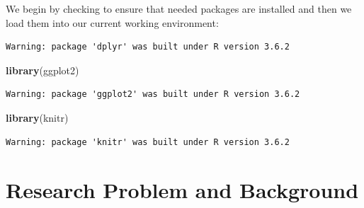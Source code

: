 \documentclass[12pt,twoside]{reedthesis}
\newenvironment{Shaded}{\begin{snugshade}}{\end{snugshade}}
\newcommand{\CommentTok}[1]{\textcolor[rgb]{0.56,0.35,0.01}{\textit{#1}}}
\newcommand{\ControlFlowTok}[1]{\textcolor[rgb]{0.13,0.29,0.53}{\textbf{#1}}}
\newcommand{\DataTypeTok}[1]{\textcolor[rgb]{0.13,0.29,0.53}{#1}}
\newcommand{\KeywordTok}[1]{\textcolor[rgb]{0.13,0.29,0.53}{\textbf{#1}}}
\newcommand{\NormalTok}[1]{#1}
\newcommand{\OperatorTok}[1]{\textcolor[rgb]{0.81,0.36,0.00}{\textbf{#1}}}
\newcommand{\StringTok}[1]{\textcolor[rgb]{0.31,0.60,0.02}{#1}}
\begin{document}
We begin by checking to ensure that needed packages are installed and then we load them into our current working environment:
\begin{Shaded}
\end{Shaded}
\begin{verbatim}
Warning: package 'dplyr' was built under R version 3.6.2
\end{verbatim}
\begin{Shaded}
\begin{Highlighting}[]
\KeywordTok{library}\NormalTok{(ggplot2)}
\end{Highlighting}
\end{Shaded}
\begin{verbatim}
Warning: package 'ggplot2' was built under R version 3.6.2
\end{verbatim}
\begin{Shaded}
\begin{Highlighting}[]
\KeywordTok{library}\NormalTok{(knitr)}
\end{Highlighting}
\end{Shaded}
\begin{verbatim}
Warning: package 'knitr' was built under R version 3.6.2
\end{verbatim}
\clearpage

\hypertarget{research-problem-and-background}{%
\section{Research Problem and Background}\label{research-problem-and-background}}
\end{document}
